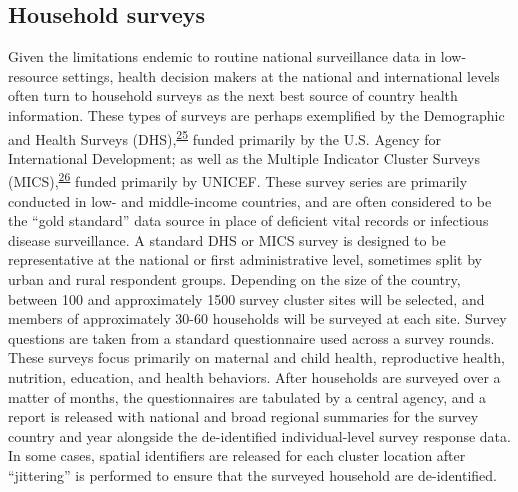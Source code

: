 \documentclass[
]{article}
\begin{document}
\hypertarget{household-surveys}{%
\subsection{Household surveys}\label{household-surveys}}

Given the limitations endemic to routine national surveillance data in low-resource settings, health decision makers at the national and international levels often turn to household surveys as the next best source of country health information. These types of surveys are perhaps exemplified by the Demographic and Health Surveys (DHS),\textsuperscript{\protect\hyperlink{ref-Corsi2012}{25}} funded primarily by the U.S. Agency for International Development; as well as the Multiple Indicator Cluster Surveys (MICS),\textsuperscript{\protect\hyperlink{ref-Khan2019}{26}} funded primarily by UNICEF. These survey series are primarily conducted in low- and middle-income countries, and are often considered to be the ``gold standard'' data source in place of deficient vital records or infectious disease surveillance. A standard DHS or MICS survey is designed to be representative at the national or first administrative level, sometimes split by urban and rural respondent groups. Depending on the size of the country, between 100 and approximately 1500 survey cluster sites will be selected, and members of approximately 30-60 households will be surveyed at each site. Survey questions are taken from a standard questionnaire used across a survey rounds. These surveys focus primarily on maternal and child health, reproductive health, nutrition, education, and health behaviors. After households are surveyed over a matter of months, the questionnaires are tabulated by a central agency, and a report is released with national and broad regional summaries for the survey country and year alongside the de-identified individual-level survey response data. In some cases, spatial identifiers are released for each cluster location after ``jittering'' is performed to ensure that the surveyed household are de-identified.
\end{document}
